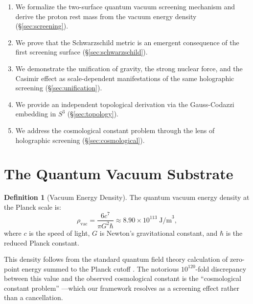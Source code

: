 \documentclass[12pt, a4paper]{article}
\theoremstyle{plain}
\theoremstyle{definition}
\newtheorem{definition}[theorem]{Definition}
\theoremstyle{remark}
\begin{document}
\begin{enumerate}
  \item We formalize the two-surface quantum vacuum screening mechanism and
    derive the proton rest mass from the vacuum energy density
    (\S\ref{sec:screening}).
  \item We prove that the Schwarzschild metric is an emergent consequence
    of the first screening surface (\S\ref{sec:schwarzschild}).
  \item We demonstrate the unification of gravity, the strong nuclear force,
    and the Casimir effect as scale-dependent manifestations of the same
    holographic screening (\S\ref{sec:unification}).
  \item We provide an independent topological derivation via the Gauss-Codazzi
    embedding in $S^3$ (\S\ref{sec:topology}).
  \item We address the cosmological constant problem through the lens of
    holographic screening (\S\ref{sec:cosmological}).
\end{enumerate}

\section{The Quantum Vacuum Substrate}\label{sec:vacuum}

\begin{definition}[Vacuum Energy Density]\label{def:rho_vac}
  The quantum vacuum energy density at the Planck scale is:
  \begin{equation}\label{eq:rho_vac}
    \rho_{\text{vac}} = \frac{6c^7}{\pi G^2 \hbar}
    \approx 8.90 \times 10^{113} \; \text{J/m}^3,
  \end{equation}
  where $c$ is the speed of light, $G$ is Newton's gravitational constant,
  and $\hbar$ is the reduced Planck constant.
\end{definition}

This density follows from the standard quantum field theory calculation of
zero-point energy summed to the Planck cutoff \citep{Weinberg1989}. The
notorious $10^{120}$-fold discrepancy between this value and the observed
cosmological constant is the ``cosmological constant problem''
\citep{Weinberg1989}---which our framework resolves as a screening effect
rather than a cancellation.
\end{document}
